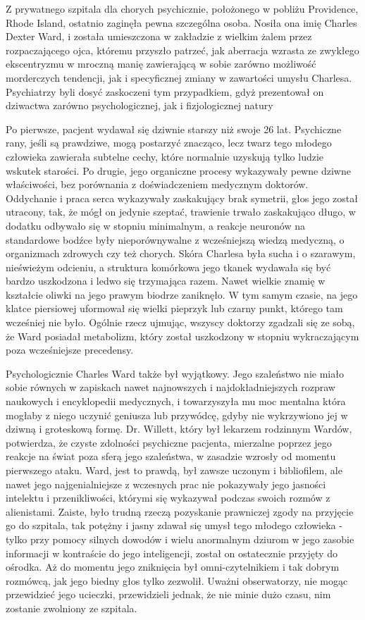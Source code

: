 Z prywatnego szpitala dla chorych psychicznie, położonego w pobliżu Providence, Rhode Island, ostatnio zaginęła pewna szczególna osoba. Nosiła ona imię Charles Dexter Ward, i została umieszczona w zakładzie z wielkim żalem przez rozpaczającego ojca, któremu przyszło patrzeć, jak aberracja wzrasta ze zwykłego ekscentryzmu w mroczną manię zawierającą w sobie zarówno możliwość morderczych tendencji, jak i specyficznej zmiany w zawartości umysłu Charlesa. Psychiatrzy byli dosyć zaskoczeni tym przypadkiem, gdyż prezentował on dziwactwa zarówno psychologicznej, jak i fizjologicznej natury

Po pierwsze, pacjent wydawał się dziwnie starszy niż swoje 26 lat. Psychiczne rany, jeśli są prawdziwe, mogą postarzyć znacząco, lecz twarz tego młodego człowieka zawierała subtelne cechy, które normalnie uzyskują tylko ludzie wskutek starości. Po drugie, jego organiczne procesy wykazywały pewne dziwne właściwości, bez porównania z doświadczeniem medycznym doktorów. Oddychanie i praca serca wykazywały zaskakujący brak symetrii, głos jego został utracony, tak, że mógł on jedynie szeptać, trawienie trwało zaskakująco długo, w dodatku odbywało się w stopniu minimalnym, a reakcje neuronów na standardowe bodźce były nieporównywalne z wcześniejszą wiedzą medyczną, o organizmach zdrowych czy też chorych. Skóra Charlesa była sucha i o szarawym, nieświeżym odcieniu, a struktura komórkowa jego tkanek wydawała się być bardzo uszkodzona i ledwo się trzymająca razem. Nawet wielkie znamię w kształcie oliwki na jego prawym biodrze zaniknęło. W tym samym czasie, na jego klatce piersiowej uformował się wielki pieprzyk lub czarny punkt, którego tam wcześniej nie było. Ogólnie rzecz ujmując, wszyscy doktorzy zgadzali się ze sobą, że Ward posiadał metabolizm, który został uszkodzony w stopniu wykraczającym poza wcześniejsze precedensy.

Psychologicznie Charles Ward także był wyjątkowy. Jego szaleństwo nie miało sobie równych w zapiskach nawet najnowszych i najdokładniejszych rozpraw naukowych i encyklopedii medycznych, i towarzyszyła mu moc mentalna która mogłaby z niego uczynić geniusza lub przywódcę, gdyby nie wykrzywiono jej w dziwną i groteskową formę. Dr. Willett, który był lekarzem rodzinnym Wardów, potwierdza, że czyste zdolności psychiczne pacjenta, mierzalne poprzez jego reakcje na świat poza sferą jego szaleństwa, w zasadzie wzrosły od momentu pierwszego ataku. Ward, jest to prawdą, był zawsze uczonym i bibliofilem, ale nawet jego najgenialniejsze z wczesnych prac nie pokazywały jego jasności intelektu i przenikliwości, którymi się wykazywał podczas swoich rozmów z alienistami. Zaiste, było trudną rzeczą pozyskanie prawniczej zgody na przyjęcie go do szpitala, tak potężny i jasny zdawał się umysł tego młodego człowieka - tylko przy pomocy silnych dowodów i wielu anormalnym dziurom w jego zasobie informacji w kontraście do jego inteligencji, został on ostatecznie przyjęty do ośrodka. Aż do momentu jego zniknięcia był omni-czytelnikiem i tak dobrym rozmówcą, jak jego biedny głos tylko zezwolił. Uważni obserwatorzy, nie mogąc przewidzieć jego ucieczki, przewidzieli jednak, że nie minie dużo czasu, nim zostanie zwolniony ze szpitala.

